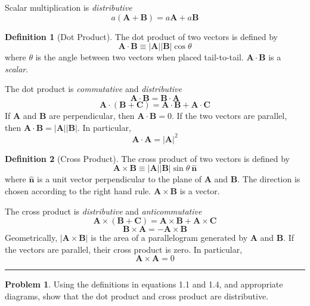 \documentclass{article}
\theoremstyle{definition}
\newtheorem*{definition}{Definition}
\newtheorem{problem}{Problem}[section]
\theoremstyle{remark}
\newcommand{\pline}{\par\noindent\rule{\textwidth}{0.5pt}}
\newcommand{\abs}[1]{\left|#1\right|}
\renewcommand{\vec}{\mathbf}
\newcommand{\veca}{\vec{A}}
\newcommand{\vecb}{\vec{B}}
\newcommand{\vecc}{\vec{C}}
\newcommand{\unitnorm}{\hat{\vec{n}}}
\newcommand{\cross}{\times}
\begin{document}
\noindent Scalar multiplication is \textit{distributive}
\[a(\veca+\vecb) = a\veca+a\vecb\]

\begin{definition}[Dot Product]
The dot product of two vectors is defined by 
\begin{equation}
\veca\cdot\vecb\equiv\abs{\veca}\abs{\vecb}\cos{\theta}
\end{equation}
where $\theta$ is the angle between two vectors when placed tail-to-tail.  $\veca\cdot\vecb$ is a \textit{scalar}.
\end{definition}

\noindent The dot product is \textit{commutative} and \textit{distributive}
\[\veca\cdot\vecb = \vecb\cdot\veca\]
\begin{equation}
\veca\cdot(\vecb+\vecc) = \veca\cdot\vecb+\veca\cdot\vecc
\end{equation}
If $\veca$ and $\vecb$ are perpendicular, then $\veca\cdot\vecb = 0$. If the two vectors are parallel, then $\veca\cdot\vecb = \abs{\veca}\abs{\vecb}$. In particular,
\begin{equation}
\veca\cdot\veca = \abs{\veca}^{2}
\end{equation}

\begin{definition}[Cross Product]
The cross product of two vectors is defined by
\begin{equation}
\veca\cross\vecb\equiv\abs{\veca}\abs{\vecb}\sin{\theta}\ \unitnorm
\end{equation}
where $\unitnorm$ is a unit vector perpendicular to the plane of $\veca$ and $\vecb$. The direction is chosen according to the right hand rule. $\veca\cross\vecb$ is a vector.
\end{definition}

\noindent The cross product is \textit{distributive} and \textit{anticommutative}
\begin{equation}
\veca\cross(\vecb+\vecc) = \veca\cross\vecb+\veca\cross\vecc
\end{equation}
\begin{equation}
\vecb\cross\veca = -\veca\cross\vecb
\end{equation}
Geometrically, $\abs{\veca\cross\vecb}$ is the area of a parallelogram generated by $\veca$ and $\vecb$. If the vectors are parallel, their cross product is zero. In particular,
\[\veca\cross\veca = 0\]

\pline
\begin{problem}
Using the definitions in equations 1.1 and 1.4, and appropriate diagrams, show that the dot product and cross product are distributive.
\end{problem}
\end{document}
